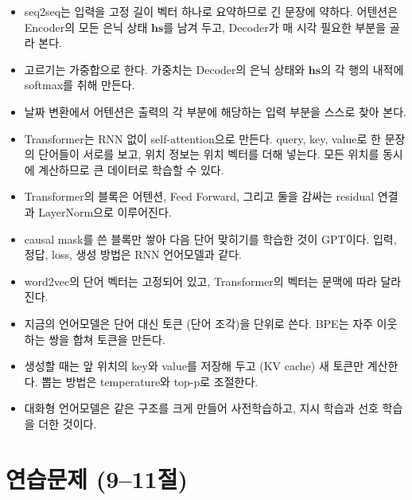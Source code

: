 \documentclass[11pt,a4paper]{article}
\newcommand{\vect}[1]{\bm{#1}}
\begin{document}
\begin{mlbox}[9--11절 정리]
\begin{itemize}[leftmargin=1.5em]
\item seq2seq는 입력을 고정 길이 벡터 하나로 요약하므로 긴 문장에 약하다. 어텐션은 Encoder의 모든 은닉 상태 $\vect{hs}$를 남겨 두고, Decoder가 매 시각 필요한 부분을 골라 본다.
\item 고르기는 가중합으로 한다. 가중치는 Decoder의 은닉 상태와 $\vect{hs}$의 각 행의 내적에 softmax를 취해 만든다.
\item 날짜 변환에서 어텐션은 출력의 각 부분에 해당하는 입력 부분을 스스로 찾아 본다.
\item Transformer는 RNN 없이 self-attention으로 만든다. query, key, value로 한 문장의 단어들이 서로를 보고, 위치 정보는 위치 벡터를 더해 넣는다. 모든 위치를 동시에 계산하므로 큰 데이터로 학습할 수 있다.
\item Transformer의 블록은 어텐션, Feed Forward, 그리고 둘을 감싸는 residual 연결과 LayerNorm으로 이루어진다.
\item causal mask를 쓴 블록만 쌓아 다음 단어 맞히기를 학습한 것이 GPT이다. 입력, 정답, loss, 생성 방법은 RNN 언어모델과 같다.
\item word2vec의 단어 벡터는 고정되어 있고, Transformer의 벡터는 문맥에 따라 달라진다.
\item 지금의 언어모델은 단어 대신 토큰 (단어 조각)을 단위로 쓴다. BPE는 자주 이웃하는 쌍을 합쳐 토큰을 만든다.
\item 생성할 때는 앞 위치의 key와 value를 저장해 두고 (KV cache) 새 토큰만 계산한다. 뽑는 방법은 temperature와 top-p로 조절한다.
\item 대화형 언어모델은 같은 구조를 크게 만들어 사전학습하고, 지시 학습과 선호 학습을 더한 것이다.
\end{itemize}
\end{mlbox}

\section*{연습문제 (9--11절)}
\end{document}
